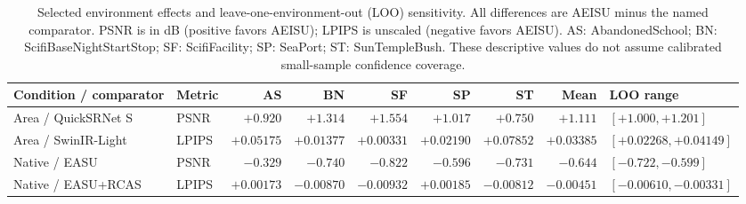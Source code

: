 \begin{table}[t]
\centering\footnotesize
\setlength{\tabcolsep}{3pt}
\caption{Selected environment effects and leave-one-environment-out (LOO) sensitivity. All differences are AEISU minus the named comparator. PSNR is in dB (positive favors AEISU); LPIPS is unscaled (negative favors AEISU). AS: AbandonedSchool; BN: ScifiBaseNightStartStop; SF: ScifiFacility; SP: SeaPort; ST: SunTempleBush. These descriptive values do not assume calibrated small-sample confidence coverage.}
\label{tab:environment-sensitivity}
\begin{tabular}{llrrrrrrl}
\toprule
Condition / comparator & Metric & AS & BN & SF & SP & ST & Mean & LOO range\\
\midrule
Area / QuickSRNet S & PSNR & $+0.920$ & $+1.314$ & $+1.554$ & $+1.017$ & $+0.750$ & $+1.111$ & $[+1.000,+1.201]$\\
Area / SwinIR-Light & LPIPS & $+0.05175$ & $+0.01377$ & $+0.00331$ & $+0.02190$ & $+0.07852$ & $+0.03385$ & $[+0.02268,+0.04149]$\\
Native / EASU & PSNR & $-0.329$ & $-0.740$ & $-0.822$ & $-0.596$ & $-0.731$ & $-0.644$ & $[-0.722,-0.599]$\\
Native / EASU+RCAS & LPIPS & $+0.00173$ & $-0.00870$ & $-0.00932$ & $+0.00185$ & $-0.00812$ & $-0.00451$ & $[-0.00610,-0.00331]$\\
\bottomrule
\end{tabular}
\end{table}
